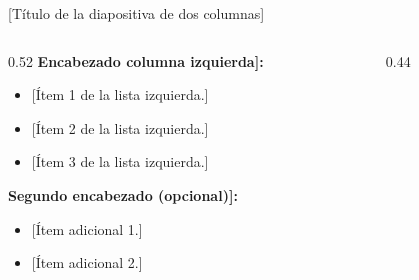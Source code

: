 \documentclass[aspectratio=169, 12pt]{beamer}
\begin{document}
\begin{frame}{[Título de la diapositiva de dos columnas]}
  \begin{columns}[T]
    \begin{column}{0.52\textwidth}
      \textbf{\color{AzulITM}{[}Encabezado columna izquierda{]}:}
      \begin{itemize}
        \item {[}Ítem 1 de la lista izquierda.{]}
        \item {[}Ítem 2 de la lista izquierda.{]}
        \item {[}Ítem 3 de la lista izquierda.{]}
      \end{itemize}
      \vspace{0.4em}
      \textbf{\color{AzulITM}{[}Segundo encabezado (opcional){]}:}
      \begin{itemize}
        \item {[}Ítem adicional 1.{]}
        \item {[}Ítem adicional 2.{]}
      \end{itemize}
    \end{column}
    \begin{column}{0.44\textwidth}
      \begin{center}
      \end{center}
    \end{column}
  \end{columns}
\end{frame}
\end{document}
